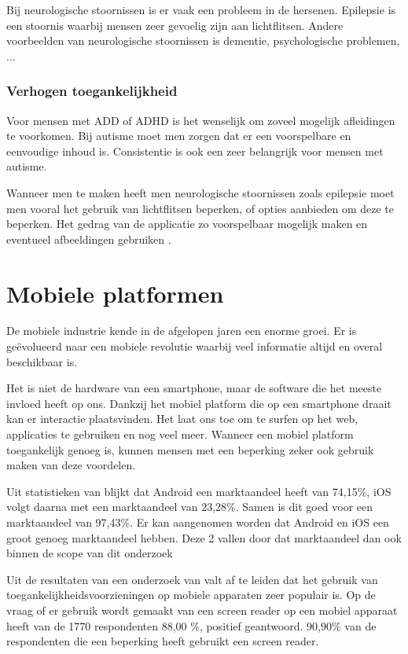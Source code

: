 Bij neurologische stoornissen is er vaak een probleem in de hersenen. Epilepsie is een stoornis waarbij mensen zeer gevoelig zijn aan lichtflitsen. Andere voorbeelden van neurologische stoornissen is dementie, psychologische problemen, ... 
\autocite{patel2016mental}

\subsubsection{Verhogen toegankelijkheid}
Voor mensen met ADD of ADHD is het wenselijk om zoveel mogelijk afleidingen te voorkomen. Bij autisme moet men zorgen dat er een voorspelbare en eenvoudige inhoud is.  Consistentie is ook een zeer belangrijk voor mensen met autisme.

Wanneer men te maken heeft men neurologische stoornissen zoals epilepsie moet men vooral het gebruik van lichtflitsen beperken, of opties aanbieden om deze te beperken. Het gedrag van de applicatie zo voorspelbaar mogelijk maken en eventueel afbeeldingen gebruiken \autocite{accessibility2019}.



\section{Mobiele platformen}
\label{sec:mobielePlatformen}
De mobiele industrie kende in de afgelopen jaren een enorme groei. Er is geëvolueerd naar een mobiele revolutie waarbij veel informatie altijd en overal beschikbaar is.

Het is niet de hardware van een smartphone, maar de software die het meeste invloed heeft op ons. Dankzij het mobiel platform die op een smartphone draait kan er interactie plaatsvinden. Het laat ons toe om te surfen op het web, applicaties te gebruiken en nog veel meer. Wanneer een mobiel platform toegankelijk genoeg is, kunnen mensen met een beperking zeker ook gebruik maken van deze voordelen.


Uit statistieken van \textcite{statMobile2019} blijkt dat Android een marktaandeel heeft van 74,15\%, iOS volgt daarna met een marktaandeel van 23,28\%. Samen is dit goed voor een marktaandeel van 97,43\%. Er kan aangenomen worden dat Android en iOS een groot genoeg marktaandeel hebben. Deze 2 vallen door dat marktaandeel dan ook binnen de scope van dit onderzoek

Uit de resultaten van een onderzoek van \textcite{webAIMSurvey} valt af te leiden dat het gebruik van toegankelijkheidsvoorzieningen op mobiele apparaten zeer populair is. Op de vraag of er gebruik wordt gemaakt van een screen reader op een mobiel apparaat heeft van de 1770 respondenten 88,00 \%, positief geantwoord. 90,90\% van de respondenten die een beperking heeft gebruikt een screen reader.


